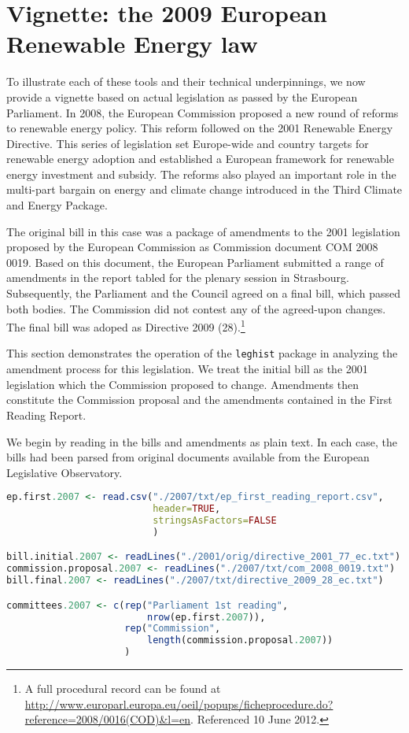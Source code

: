 \documentclass[11pt]{article}
\begin{document}
\section{Vignette: the 2009 European Renewable Energy law }
\label{sec:vign-2009-europ}

To illustrate each of these tools and their technical underpinnings,
we now provide a vignette based on actual legislation as passed by the
European Parliament. In 2008, the European Commission proposed a new
round of reforms to renewable energy policy. This reform followed
on the 2001 Renewable Energy Directive. This series of legislation set
Europe-wide and country targets for renewable energy adoption and
established a European framework for renewable energy investment and
subsidy. The reforms also played an important role in the multi-part
bargain on energy and climate change introduced in the Third Climate
and Energy Package.

The original bill in this case was a package of amendments to the 2001
legislation proposed by the European Commission as Commission document
COM 2008 0019. Based on this document, the European Parliament
submitted a range of amendments in the report tabled for the plenary
session in Strasbourg. Subsequently, the Parliament and the Council
agreed on a final bill, which passed both bodies. The Commission did
not contest any of the agreed-upon changes. The final bill was
adoped as Directive 2009 (28).\footnote{A full procedural record can
  be found at
  \url{http://www.europarl.europa.eu/oeil/popups/ficheprocedure.do?reference=2008/0016(COD)&l=en}. Referenced
10 June 2012.} 

This section demonstrates the operation of the \texttt{leghist}
package in analyzing the amendment process for this legislation. We
treat the initial bill as the 2001 legislation which the Commission
proposed to change. Amendments then constitute the Commission proposal
and the amendments contained in the First Reading
Report. 

We begin by reading in the bills and amendments as plain text. In each
case, the bills had been parsed from original documents available from
the European Legislative Observatory. 

\begin{lstlisting}[language=R, numbers=none]
ep.first.2007 <- read.csv("./2007/txt/ep_first_reading_report.csv",
                          header=TRUE,
                          stringsAsFactors=FALSE
                          )

bill.initial.2007 <- readLines("./2001/orig/directive_2001_77_ec.txt")
commission.proposal.2007 <- readLines("./2007/txt/com_2008_0019.txt")
bill.final.2007 <- readLines("./2007/txt/directive_2009_28_ec.txt")

committees.2007 <- c(rep("Parliament 1st reading",
                         nrow(ep.first.2007)),
                     rep("Commission",
                         length(commission.proposal.2007))
                     )

\end{lstlisting}
\end{document}
